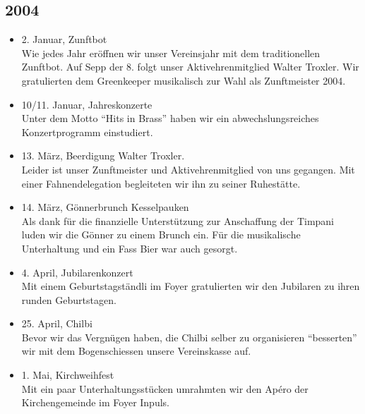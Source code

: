 \subsection*{2004}

\begin{history}


    \begin{itemize}

        \item 2. Januar, Zunftbot\\
              Wie jedes Jahr eröffnen wir unser Vereinsjahr mit dem traditionellen
              Zunftbot. Auf Sepp der 8. folgt unser Aktivehrenmitglied Walter Troxler.
              Wir gratulierten dem Greenkeeper musikalisch zur Wahl als Zunftmeister
              2004.

        \item 10/11. Januar, Jahreskonzerte\\
              Unter dem Motto \enquote{Hits in Brass} haben wir ein
              abwechslungsreiches Konzertprogramm einstudiert.

        \item 13. März, Beerdigung Walter Troxler.\\
              Leider ist unser Zunftmeister und Aktivehrenmitglied von uns gegangen.
              Mit einer Fahnendelegation begleiteten wir ihn zu seiner Ruhestätte.

        \item 14. März, Gönnerbrunch Kesselpauken\\
              Als dank für die finanzielle Unterstützung zur Anschaffung der Timpani
              luden wir die Gönner zu einem Brunch ein. Für die musikalische
              Unterhaltung und ein Fass Bier war auch gesorgt.

        \item 4. April, Jubilarenkonzert\\
              Mit einem Geburtstagständli im Foyer gratulierten wir den Jubilaren zu
              ihren runden Geburtstagen.

        \item 25. April, Chilbi\\
              Bevor wir das Vergnügen haben, die Chilbi selber zu organisieren
              \enquote{besserten} wir mit dem Bogenschiessen unsere Vereinskasse auf.

        \item 1. Mai, Kirchweihfest\\
              Mit ein paar Unterhaltungsstücken umrahmten wir den Apéro
              der Kirchengemeinde im Foyer Inpuls.


\end{itemize}
\end{history}
